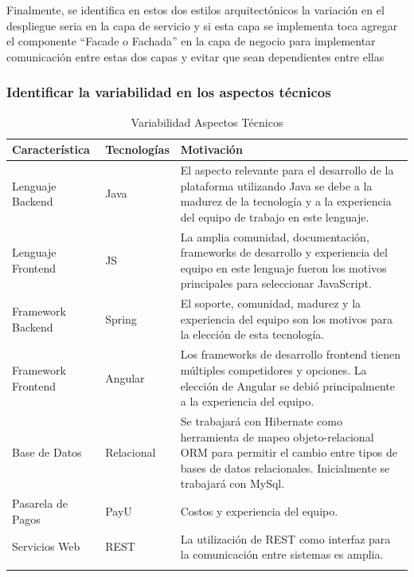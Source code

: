 \documentclass[10pt,a4paper,openany]{book}
\begin{document}
Finalmente, se identifica en estos dos estilos arquitectónicos la variación en el despliegue seria en la capa de servicio y si esta capa se implementa toca agregar el componente “Facade o Fachada” en la capa de negocio para implementar comunicación entre estas dos capas y evitar que sean dependientes entre ellas   

\subsubsection{Identificar la variabilidad en los aspectos técnicos}

\begin{longtable}{|p{2cm}|p{2cm}|p{8cm}|} \hline
Característica & Tecnologías& Motivación\\[0.5ex] \hline
Lenguaje Backend & Java& El aspecto relevante para el desarrollo de la plataforma utilizando Java se debe a la madurez de la tecnología y a la experiencia del equipo de trabajo en este lenguaje.\\[0.5ex] \hline
Lenguaje Frontend & JS& La amplia comunidad, documentación, frameworks de desarrollo y experiencia del equipo en este lenguaje fueron los motivos principales para seleccionar JavaScript.\\[0.5ex] \hline
Framework Backend &  Spring& El soporte, comunidad, madurez y la experiencia del equipo son los motivos para la elección de esta tecnología.\\[0.5ex] \hline
Framework Frontend &  Angular& Los frameworks de desarrollo frontend tienen múltiples competidores y opciones. La elección de Angular se debió principalmente a la experiencia del equipo.\\[0.5ex] \hline
Base de Datos &  Relacional& Se trabajará con Hibernate como herramienta de mapeo objeto-relacional ORM para permitir el cambio entre tipos de bases de datos relacionales. Inicialmente se trabajará con MySql.\\[0.5ex] \hline
Pasarela de Pagos & PayU& Costos y experiencia del equipo.\\[0.5ex] \hline
Servicios Web & REST& La utilización de REST como interfaz para la comunicación entre sistemas es amplia. \\[0.5ex] \hline
\caption{Variabilidad Aspectos Técnicos}
\label{table:t6}
\end{longtable}
\end{document}
